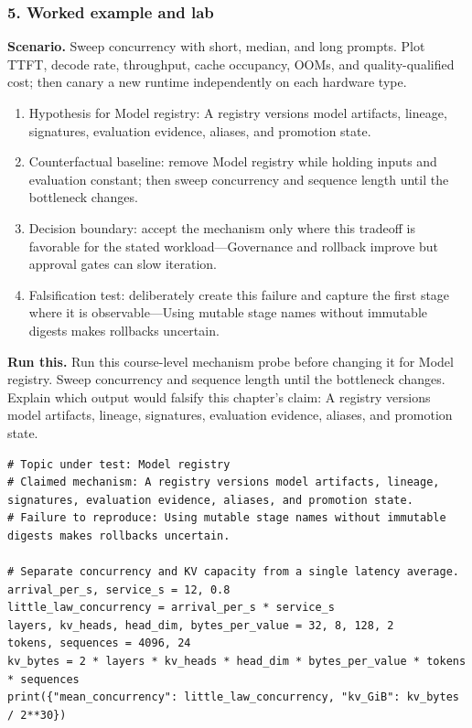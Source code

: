 \subsubsection*{5. Worked example and lab}
\textbf{Scenario.} Sweep concurrency with short, median, and long prompts. Plot TTFT, decode rate, throughput, cache occupancy, OOMs, and quality-qualified cost; then canary a new runtime independently on each hardware type.
\begin{enumerate}
\item Hypothesis for Model registry: A registry versions model artifacts, lineage, signatures, evaluation evidence, aliases, and promotion state.
\item Counterfactual baseline: remove Model registry while holding inputs and evaluation constant; then sweep concurrency and sequence length until the bottleneck changes.
\item Decision boundary: accept the mechanism only where this tradeoff is favorable for the stated workload—Governance and rollback improve but approval gates can slow iteration.
\item Falsification test: deliberately create this failure and capture the first stage where it is observable—Using mutable stage names without immutable digests makes rollbacks uncertain.
\end{enumerate}
\textbf{Run this.} Run this course-level mechanism probe before changing it for Model registry. Sweep concurrency and sequence length until the bottleneck changes. Explain which output would falsify this chapter's claim: A registry versions model artifacts, lineage, signatures, evaluation evidence, aliases, and promotion state.
\begin{Verbatim}[fontsize=\scriptsize]
# Topic under test: Model registry
# Claimed mechanism: A registry versions model artifacts, lineage, signatures, evaluation evidence, aliases, and promotion state.
# Failure to reproduce: Using mutable stage names without immutable digests makes rollbacks uncertain.

# Separate concurrency and KV capacity from a single latency average.
arrival_per_s, service_s = 12, 0.8
little_law_concurrency = arrival_per_s * service_s
layers, kv_heads, head_dim, bytes_per_value = 32, 8, 128, 2
tokens, sequences = 4096, 24
kv_bytes = 2 * layers * kv_heads * head_dim * bytes_per_value * tokens * sequences
print({"mean_concurrency": little_law_concurrency, "kv_GiB": kv_bytes / 2**30})
\end{Verbatim}

